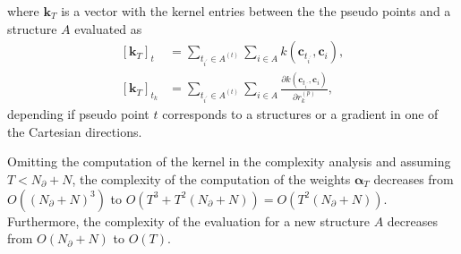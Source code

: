 where $\mathbf{k}_{T}$ is a vector with the kernel entries between the the pseudo points and a structure $A$ evaluated as
\begin{subequations}
  \begin{align}
    [\mathbf{k}_{T}]_{t} &= 
      \sum_{t_{i^\prime}\in A^{(t)}}\sum_{i\in A} k(\mathbf{c}_{t_{i^\prime}}, \mathbf{c}_{i}), \\
    [\mathbf{k}_{T}]_{t_k} &= 
      \sum_{t_{i^\prime}\in A^{(t)}}\sum_{i\in A} \frac{\partial k(\mathbf{c}_{t_{i^\prime}}, \mathbf{c}_{i})}{\partial r_k^{(p)}},
  \end{align}
\end{subequations}
depending if pseudo point $t$ corresponds to a structures or a gradient in one of the Cartesian directions.

Omitting the computation of the kernel in the complexity analysis and assuming $T < N_{\partial} + N$, 
the complexity of the computation of the weights $\boldsymbol{\alpha}_T$ decreases from $O((N_{\partial} + N)^3)$ to $O(T^3 + T^2(N_{\partial} + N)) = O(T^2(N_{\partial} + N))$.
Furthermore, the complexity of the evaluation for a new structure $A$ decreases from $O(N_{\partial}+N)$ to $O(T)$.


